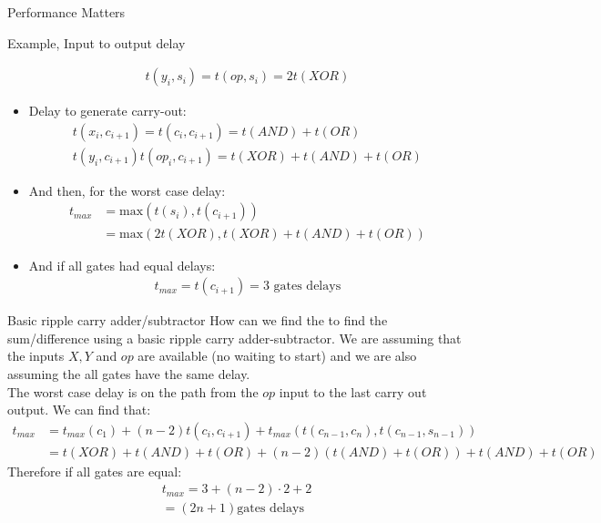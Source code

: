 \begin{parag}{Performance Matters}
\begin{subparag}{Example, Input to output delay}
\begin{itemize}
\begin{align*}
              t(y_i, s_i) = t(op, s_i) = 2t(XOR)
          \end{align*}
      \item Delay to generate carry-out:
          \begin{align*}
              t(x_i, c_{i+1}) =t(c_i, c_{i+1}) = t(AND) + t(OR)\\
 t(y_i, c_{i+1}) t(op_i, c_{i+1}) = t(XOR) + t(AND) + t(OR)
          \end{align*}
      \item And then, for the worst case delay:
          \begin{align*}
              t_{max} &= \text{max}(t(s_i), t(c_{i+1}))\\
                      &= \text{max}(2t(XOR), t(XOR) + t(AND) + t(OR))
          \end{align*}
      \item And if all gates had equal delays:
          \begin{align*}
              t_{max} = t(c_{i+1}) = 3 \text{ gates delays}
          \end{align*}
          
  \end{itemize}
\end{subparag}
\begin{subparag}{Basic ripple carry adder/subtractor}
    How can we find the  to find the sum/difference using a basic ripple carry adder-subtractor. We are assuming that the inputs $X, Y$ and $op$ are available (no waiting to start) and we are also assuming the all gates have the same delay.
    \\
    The worst case delay is on the path from the $op$ input to the last carry out output. We can find that:
    \begin{align*}
        t_{max} &= t_{max}(c_1) + (n-2)t(c_i, c_{i+1}) + t_{max}(t(c_{n-1}, c_n), t(c_{n-1}, s_{n-1})) \\
                &= t(XOR) + t(AND) + t(OR) + (n-2)(t(AND) + t(OR)) + t(AND) + t(OR)
    \end{align*}
    Therefore if all gates are equal:
    \begin{align*}
        t_{max} = 3 + (n-2)\cdot 2 + 2\\
        = (2n+1) \text{gates delays}
    \end{align*}
    
    
    
\end{subparag}
\end{parag}


